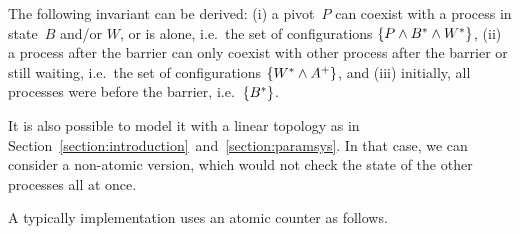 \begin{center}
\end{center}

The following invariant can be derived: %
(i) a pivot~$P$ can coexist with a process in state~$B$ and/or $W$, or
is alone, i.e.\ the set of configurations $\{P\wedge B^* \wedge
  W^*\}$, %
(ii) a process after the barrier can only coexist with other process
after the barrier or still waiting, i.e.\ the set of configurations
$\{W^* \wedge A^+\}$, %
and (iii) initially, all processes were before the barrier, i.e.\
$\{B^*\}$.

It is also possible to model it with a linear topology as in
Section~\ref{section:introduction}~and~\ref{section:paramsys}. %
In that case, we can consider a non-atomic version, which would not
check the state of the other processes all at once.

A typically implementation uses an atomic counter as follows.

